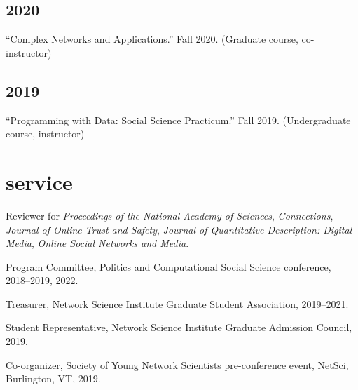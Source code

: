 \documentclass[11pt, letter]{article}
\begin{document}
\subsection{2020}
\begin{hangparas}{.25in}{1}
``Complex Networks and Applications.'' Fall 2020. (Graduate course, co-instructor)
\end{hangparas}
\vspace{1mm}

\subsection{2019}
\begin{hangparas}{.25in}{1}
``Programming with Data: Social Science Practicum.'' Fall 2019. (Undergraduate course, instructor) \vspace{2mm}
\end{hangparas}


 \section{service}
 Reviewer for \textit{Proceedings of the National Academy of Sciences}, \textit{Connections}, \textit{Journal of Online Trust and Safety}, \textit{Journal of Quantitative Description: Digital Media}, \textit{Online Social Networks and Media}.

 Program Committee, Politics and Computational Social Science conference, 2018--2019, 2022.

 Treasurer, Network Science Institute Graduate Student Association, 2019--2021.

 Student Representative, Network Science Institute Graduate Admission Council, 2019.

 Co-organizer, Society of Young Network Scientists pre-conference event, NetSci, Burlington, VT, 2019.
\end{document}
